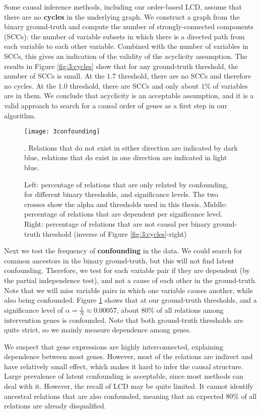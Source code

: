 Some causal inference methods, including our order-based LCD, assume that there are no \textbf{cycles} in the underlying graph. We construct a graph from the binary ground-truth and compute the number of strongly-connected components (SCCs): the number of variable subsets in which there is a directed path from each variable to each other variable. Combined with the number of variables in SCCs, this gives an indication of the validity of the acyclicity assumption. The results in Figure \ref{fig:3:cycles} show that for any ground-truth threshold, the number of SCCs is small. At the $1.7$ threshold, there are no SCCs and therefore no cycles. At the $1.0$ threshold, there are SCCs and only about $1\%$ of variables are in them. We conclude that acyclicity is an acceptable assumption, and it is a valid approach to search for a causal order of genes as a first step in our algorithm.

\begin{figure}[h]
    \centering
    \texttt{[image: 3confounding]}
    \caption{Left: percentage of relations that are only related by confounding, for different binary thresholds, and significance levels. The two crosses show the alpha and thresholds used in this thesis. Middle: percentage of relations that are dependent per significance level. Right: percentage of relations that are not causal per binary ground-truth threshold (inverse of Figure \ref{fig:3:cycles}-right)}. Relations that do not exist in either direction are indicated by dark blue, relations that do exist in one direction are indicated in light blue.
    \label{fig:3:confounding}
\end{figure}    

Next we test the frequency of \textbf{confounding} in the data. We could search for common ancestors in the binary ground-truth, but this will not find latent confounding. Therefore, we test for each variable pair if they are dependent (by the partial independence test), and not a cause of each other in the ground-truth. Note that we will miss variable pairs in which one variable causes another, while also being confounded. Figure \ref{fig:3:confounding} shows that at our ground-truth thresholds, and a significance level of $\alpha = \frac{1}{N} \approx 0.00057$, about $80\%$ of all relations among intervention genes is confounded. Note that both ground-truth thresholds are quite strict, so we mainly measure dependence among genes. 

We suspect that gene expressions are highly interconnected, explaining dependence between most genes. However, most of the relations are indirect and have relatively small effect, which makes it hard to infer the causal structure. Large prevalence of latent confounding is acceptable, since most methods can deal with it. However, the recall of LCD may be quite limited. It cannot identify ancestral relations that are also confounded, meaning that an expected $80\%$ of all relations are already disqualified.


